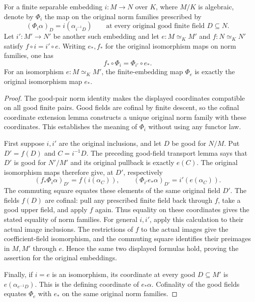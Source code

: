 \begin{lemma}
\label{fw:finite-functor-naturality}
\leanok
For a finite separable embedding $i:M\to N$ over $K$, where $M/K$
is algebraic, denote by $\Phi_i$ the map on the original norm
families prescribed by
\[
 (\Phi_i\alpha)_D=i(\alpha_{i^{-1}D})
 \qquad\text{at every original good finite field }D\subseteq N.
\]
Let $i':M'\to N'$ be another such embedding and let
$e:M\simeq_K M'$ and $f:N\simeq_K N'$ satisfy $f\circ i=i'\circ e$.
Writing $e_*,f_*$ for the original isomorphism maps on norm families,
one has
\[
 f_*\circ\Phi_i=\Phi_{i'}\circ e_*.
\]
For an isomorphism $e:M\simeq_K M'$, the finite-embedding map
$\Phi_e$ is exactly the original isomorphism map $e_*$.
\end{lemma}
\begin{proof}
The good-pair norm identity makes the displayed coordinates compatible
on all good finite pairs. Good fields are cofinal by finite descent,
so the cofinal coordinate extension lemma constructs a unique original
norm family with these coordinates. This establishes the meaning of
$\Phi_i$ without using any functor law.

First suppose $i,i'$ are the original inclusions, and let $D$ be good
for $N/M$. Put $D'=f(D)$ and $C=i^{-1}D$.
The preceding good-field transport lemma says that $D'$ is good for
$N'/M'$ and its original pullback is exactly $e(C)$.
The original isomorphism maps therefore give, at $D'$, respectively
\[
 (f_*\Phi_i\alpha)_{D'}=f(i(\alpha_C)),\qquad
 (\Phi_{i'}e_*\alpha)_{D'}=i'(e(\alpha_C)).
\]
The commuting square equates these elements of the same original
field $D'$. The fields $f(D)$ are cofinal: pull any prescribed finite
field back through $f$, take a good upper field, and apply $f$ again.
Thus equality on these coordinates gives the stated equality of norm
families. For general $i,i'$, apply this calculation to their actual
image inclusions. The restrictions of $f$ to the actual images give
the coefficient-field isomorphism, and the commuting square identifies
their preimages in $M,M'$ through $e$. Hence the same two displayed
formulas hold, proving the assertion for the original embeddings.

Finally, if $i=e$ is an isomorphism, its coordinate at every good
$D\subseteq M'$ is $e(\alpha_{e^{-1}D})$. This is the defining
coordinate of $e_*\alpha$. Cofinality of the good fields equates
$\Phi_e$ with $e_*$ on the same original norm families.
\end{proof}

